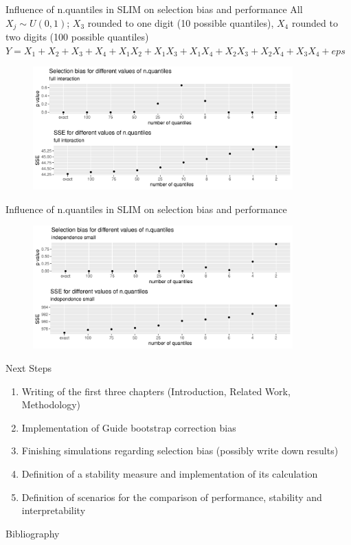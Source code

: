 \documentclass[9pt, xcolor=table]{beamer}
\begin{document}
\begin{frame}{Influence of n.quantiles in SLIM on selection bias and performance}
All $X_j \sim U(0,1)$; $X_3$ rounded to one digit (10 possible quantiles), $X_4$ rounded to two digits (100 possible quantiles)\\
$Y = X_1 + X_2 + X_3 + X_4 + X_1 X_2 + X_1 X_3 + X_1 X_4 + X_2 X_3 + X_2 X_4 + X_3 X_4 + eps$

\begin{figure}
    \includegraphics[width=10cm]{Figures/simulations/batchtools/selection_bias_slim/sse_full_interaction.pdf}
\end{figure}

\end{frame}


\begin{frame}{Influence of n.quantiles in SLIM on selection bias and performance}
\begin{figure}
    \includegraphics[width=10cm]{Figures/simulations/batchtools/selection_bias_slim/sse_independence_small.pdf}
\end{figure}
\end{frame}


\begin{frame}{Next Steps}
\begin{enumerate}
    \item Writing of the first three chapters (Introduction, Related Work, Methodology)
    \item Implementation of Guide bootstrap correction bias 
    \item Finishing simulations regarding selection bias (possibly write down results)
    \item Definition of a stability measure and implementation of its calculation
    \item Definition of scenarios for the comparison of performance, stability and interpretability
\end{enumerate}
    
\end{frame}
    


\begin{frame}{Bibliography}
    
    

\end{frame}
\end{document}
